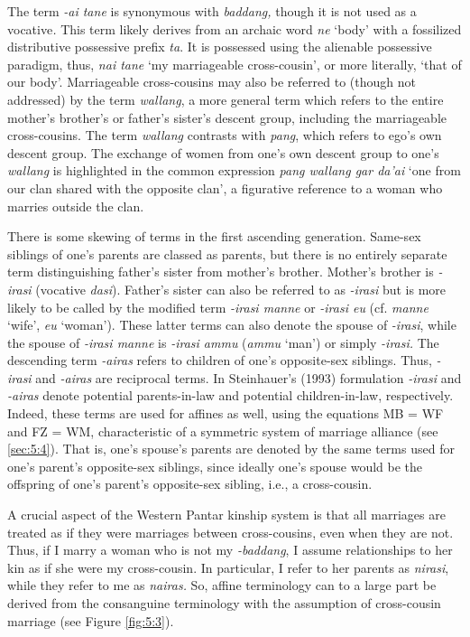 The term \textit{-ai tane} is synonymous with \textit{baddang,} though it is not used as a vocative\textit{.} This term likely derives from an archaic word \textit{ne} `body' with a fossilized distributive possessive prefix \textit{ta}. It is possessed using the alienable possessive paradigm, thus, \textit{nai tane} `my marriageable cross-cousin', or more literally, `that of our body'. Marriageable cross-cousins may also be referred to (though not addressed) by the term \textit{wallang}, a more general term which refers to the entire mother's brother's or father's sister's descent group, including the marriageable cross-cousins. The term \textit{wallang} contrasts with \textit{pang}, which refers to ego's own descent group. The exchange of women from one's own descent group to one's \textit{wallang} is highlighted in the common expression \textit{pang wallang gar da'ai} `one from our clan shared with the opposite clan', a figurative reference to a woman who marries outside the clan. 

 
There is some skewing of terms in the first ascending generation. Same-sex siblings of one's parents are classed as parents, but there is no entirely separate term distinguishing father's sister from mother's brother. Mother's brother is \textit{-irasi} (vocative \textit{dasi}). Father's sister can also be referred to as \textit{-irasi} but is more likely to be called by the modified term \textit{-irasi manne} or \textit{-irasi eu} (cf. \textit{manne} `wife', \textit{eu} `woman'). These latter terms can also denote the spouse of \textit{-irasi}, while the spouse of \textit{-irasi manne} is \textit{-irasi ammu} (\textit{ammu} `man') or simply \textit{-irasi.} The descending term \textit{-airas} refers to children of one's opposite-sex siblings. Thus, \textit{-irasi} and \textit{-airas} are reciprocal terms. In Steinhauer's (1993) formulation \textit{-irasi} and \textit{-airas} denote potential parents-in-law and potential children-in-law, respectively. Indeed, these terms are used for affines as well, using the equations MB = WF and FZ = WM, characteristic of a symmetric system of marriage alliance (see {\SS} \ref{sec:5:4}). That is, one's spouse's parents are denoted by the same terms used for one's parent's opposite-sex siblings, since ideally one's spouse would be the offspring of one's parent's opposite-sex sibling, i.e., a cross-cousin. 

  A crucial aspect of the Western Pantar kinship system is that all marriages are treated as if they were marriages between cross-cousins, even when they are not. Thus, if I marry a woman who is not my \textit{-baddang}, I assume relationships to her kin as if she were my cross-cousin. In particular, I refer to her parents as \textit{nirasi}, while they refer to me as \textit{nairas.} So, affine terminology can to a large part be derived from the consanguine terminology with the assumption of cross-cousin marriage (see Figure \ref{fig:5:3}).


